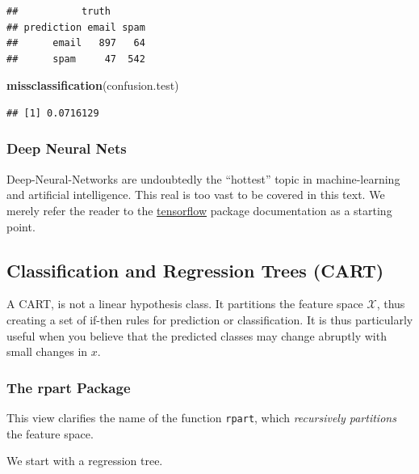 \documentclass[]{book}
\newenvironment{Shaded}{\begin{snugshade}}{\end{snugshade}}
\newcommand{\KeywordTok}[1]{\textcolor[rgb]{0.13,0.29,0.53}{\textbf{#1}}}
\newcommand{\DataTypeTok}[1]{\textcolor[rgb]{0.13,0.29,0.53}{#1}}
\newcommand{\DecValTok}[1]{\textcolor[rgb]{0.00,0.00,0.81}{#1}}
\newcommand{\StringTok}[1]{\textcolor[rgb]{0.31,0.60,0.02}{#1}}
\newcommand{\CommentTok}[1]{\textcolor[rgb]{0.56,0.35,0.01}{\textit{#1}}}
\newcommand{\OperatorTok}[1]{\textcolor[rgb]{0.81,0.36,0.00}{\textbf{#1}}}
\newcommand{\NormalTok}[1]{#1}
\theoremstyle{definition}
\theoremstyle{definition}
\theoremstyle{definition}
\theoremstyle{remark}
\begin{document}
\begin{verbatim}
##           truth
## prediction email spam
##      email   897   64
##      spam     47  542
\end{verbatim}

\begin{Shaded}
\begin{Highlighting}[]
\KeywordTok{missclassification}\NormalTok{(confusion.test)}
\end{Highlighting}
\end{Shaded}

\begin{verbatim}
## [1] 0.0716129
\end{verbatim}

\subsubsection{Deep Neural Nets}\label{deep-neural-nets}

Deep-Neural-Networks are undoubtedly the ``hottest'' topic in
machine-learning and artificial intelligence. This real is too vast to
be covered in this text. We merely refer the reader to the
\href{https://cran.r-project.org/package=tensorflow}{tensorflow} package
documentation as a starting point.

\subsection{Classification and Regression Trees (CART)}\label{trees}

A CART, is not a linear hypothesis class. It partitions the feature
space \(\mathcal{X}\), thus creating a set of if-then rules for
prediction or classification. It is thus particularly useful when you
believe that the predicted classes may change abruptly with small
changes in \(x\).

\subsubsection{The rpart Package}\label{rpart}

This view clarifies the name of the function \texttt{rpart}, which
\emph{recursively partitions} the feature space.

We start with a regression tree.

\begin{Shaded}
\end{Shaded}
\end{document}
